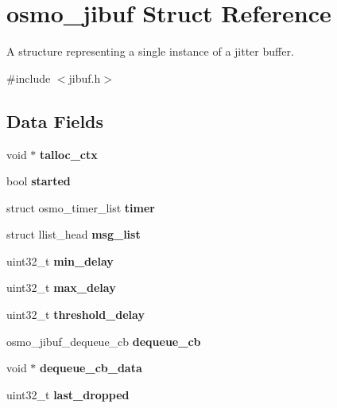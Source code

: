 \section{osmo\+\_\+jibuf Struct Reference}
\label{structosmo__jibuf}


A structure representing a single instance of a jitter buffer.  




{\ttfamily \#include $<$jibuf.\+h$>$}

\subsection*{Data Fields}
\begin{DoxyCompactItemize}
\item 
void $\ast$ {\bfseries talloc\+\_\+ctx}\label{structosmo__jibuf_aab3577d87c33b24f8c20a13f5f76d63a}

\item 
bool {\bfseries started}\label{structosmo__jibuf_abd70dab07134fbeaf8c2af54307227c3}

\item 
struct osmo\+\_\+timer\+\_\+list {\bfseries timer}\label{structosmo__jibuf_a63c88fe16b5e37fdc3603f001ed36778}

\item 
struct llist\+\_\+head {\bfseries msg\+\_\+list}\label{structosmo__jibuf_aa95f0ee45500c8fea85be7abedfbda93}

\item 
uint32\+\_\+t {\bfseries min\+\_\+delay}\label{structosmo__jibuf_a6107b527b0a63f591078fda5c48a19b2}

\item 
uint32\+\_\+t {\bfseries max\+\_\+delay}\label{structosmo__jibuf_a4c4f4199cf8cbc6ca3e0dab512ca4882}

\item 
uint32\+\_\+t {\bfseries threshold\+\_\+delay}\label{structosmo__jibuf_af3a8beebdb99d4ecf063e8361b6c7128}

\item 
osmo\+\_\+jibuf\+\_\+dequeue\+\_\+cb {\bfseries dequeue\+\_\+cb}\label{structosmo__jibuf_aa2dea6cd1e81c0153eee2131334e3e64}

\item 
void $\ast$ {\bfseries dequeue\+\_\+cb\+\_\+data}\label{structosmo__jibuf_a1bc4cf478b76c255ec7b82bd8f60f103}

\item 
uint32\+\_\+t {\bfseries last\+\_\+dropped}\label{structosmo__jibuf_a9af5787f9d704ec41beecdb5430f2eb9}


\end{DoxyCompactItemize}
